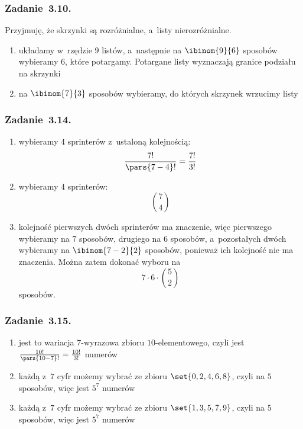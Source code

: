 \subsubsection*{Zadanie~3.10.}
Przyjmuję, że skrzynki są rozróżnialne, a~listy nierozróżnialne.
\begin{enumerate}[label={\alph*)}]
    \item układamy w~rzędzie \(9\) listów, a~następnie na \(\ibinom{9}{6}\) sposobów wybieramy \(6\), które potargamy. Potargane listy wyznaczają granice podziału na skrzynki
    \item na \(\ibinom{7}{3}\) sposobów wybieramy, do których skrzynek wrzucimy listy
\end{enumerate}
\subsubsection*{Zadanie~3.14.}
\begin{enumerate}[label={\alph*)}]
    \item wybieramy \(4\) sprinterów z~ustaloną kolejnością:
        \begin{equation*}
            \frac{7!}{\pars{7 - 4}!} = \frac{7!}{3!}
        \end{equation*}
    \item wybieramy \(4\) sprinterów:
        \begin{equation*}
            \binom{7}{4}
        \end{equation*}
    \item kolejność pierwszych dwóch sprinterów ma znaczenie, więc pierwszego wybieramy na \(7\) sposobów, drugiego na \(6\) sposobów, a~pozostałych dwóch wybieramy na \(\ibinom{7 - 2}{2}\) sposobów, ponieważ ich kolejność nie ma znaczenia. Można zatem dokonać wyboru na
        \begin{equation*}
            7 \cdot 6 \cdot \binom{5}{2}
        \end{equation*}
        sposobów.
\end{enumerate}
\subsubsection*{Zadanie~3.15.}
\begin{enumerate}[label={\alph*)}]
    \item jest to wariacja \(7\)-wyrazowa zbioru \(10\)-elementowego, czyli jest \(\frac{10!}{\pars{10 - 7}!} = \frac{10!}{3!}\) numerów
    \item każdą z~\(7\) cyfr możemy wybrać ze zbioru \(\set{0, 2, 4, 6, 8}\), czyli na \(5\) sposobów, więc jest \(5^7\) numerów
    \item każdą z~\(7\) cyfr możemy wybrać ze zbioru \(\set{1, 3, 5, 7, 9}\), czyli na \(5\) sposobów, więc jest \(5^7\) numerów
\end{enumerate}
